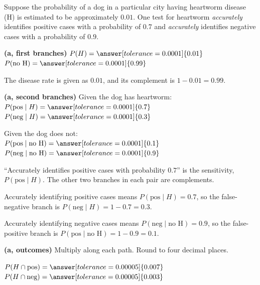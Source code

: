 \documentclass[12pt]{ximera}
\begin{document}
\begin{problem}
Suppose the probability of a dog in a particular city having heartworm disease (H) is
estimated to be approximately $0.01$. One test for heartworm \emph{accurately}
identifies positive cases with a probability of $0.7$ and \emph{accurately} identifies
negative cases with a probability of $0.9$.

\begin{prompt}
\textbf{(a, first branches)} $P(H)=\answer[tolerance=0.0001]{0.01}$ \qquad
$P(\text{no H})=\answer[tolerance=0.0001]{0.99}$

\begin{feedback}
The disease rate is given as $0.01$, and its complement is $1-0.01=0.99$.
\end{feedback}
\end{prompt}

\begin{prompt}
\textbf{(a, second branches)} Given the dog has heartworm: \\
$P(\text{pos}\mid H)=\answer[tolerance=0.0001]{0.7}$ \qquad
$P(\text{neg}\mid H)=\answer[tolerance=0.0001]{0.3}$

\smallskip
Given the dog does not: \\
$P(\text{pos}\mid \text{no H})=\answer[tolerance=0.0001]{0.1}$ \qquad
$P(\text{neg}\mid \text{no H})=\answer[tolerance=0.0001]{0.9}$

\begin{hint}
``Accurately identifies positive cases with probability $0.7$'' is the sensitivity,
$P(\text{pos}\mid H)$. The other two branches in each pair are complements.
\end{hint}

\begin{feedback}
Accurately identifying positive cases means $P(\text{pos}\mid H)=0.7$, so the
false-negative branch is $P(\text{neg}\mid H)=1-0.7=0.3$.

Accurately identifying negative cases means $P(\text{neg}\mid\text{no H})=0.9$, so the
false-positive branch is $P(\text{pos}\mid\text{no H})=1-0.9=0.1$.
\end{feedback}
\end{prompt}

\begin{prompt}
\textbf{(a, outcomes)} Multiply along each path. Round to four decimal places.

$P(H\cap\text{pos})=\answer[tolerance=0.00005]{0.007}$ \qquad
$P(H\cap\text{neg})=\answer[tolerance=0.00005]{0.003}$


\end{prompt}
\end{problem}
\end{document}
